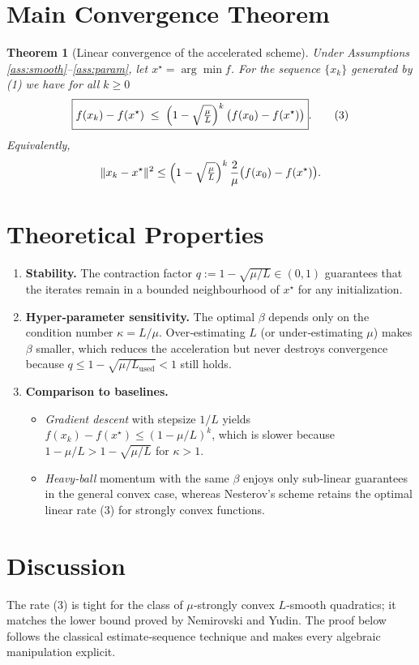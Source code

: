 \documentclass{article}
\newtheorem{theorem}{Theorem}
\begin{document}
\section*{Main Convergence Theorem}
\begin{theorem}[Linear convergence of the accelerated scheme]\label{thm:linear}
Under Assumptions \ref{ass:smooth}–\ref{ass:param}, let $x^{\star}=\arg\min f$.  
For the sequence $\{x_k\}$ generated by (1) we have for all $k\ge 0$
\[
\boxed{
f(x_k)-f(x^{\star})\;\le\;\Bigl(1-\sqrt{\tfrac{\mu}{L}}\Bigr)^{k}\,
\bigl(f(x_0)-f(x^{\star})\bigr)}.
\tag{3}
\]
Equivalently,
\[
\|x_k-x^{\star}\|^{2}\le
\Bigl(1-\sqrt{\tfrac{\mu}{L}}\Bigr)^{k}\,
\frac{2}{\mu}\bigl(f(x_0)-f(x^{\star})\bigr).
\]
\end{theorem}

\section*{Theoretical Properties}
\begin{enumerate}[label=\arabic*.]
\item \textbf{Stability.} The contraction factor $q:=1-\sqrt{\mu/L}\in(0,1)$ guarantees that the iterates remain in a bounded neighbourhood of $x^{\star}$ for any initialization.
\item \textbf{Hyper‑parameter sensitivity.} The optimal $\beta$ depends only on the condition number $\kappa=L/\mu$. Over‑estimating $L$ (or under‑estimating $\mu$) makes $\beta$ smaller, which reduces the acceleration but never destroys convergence because $q\le 1-\sqrt{\mu/L_{\text{used}}}<1$ still holds.
\item \textbf{Comparison to baselines.}
    \begin{itemize}
        \item \emph{Gradient descent} with stepsize $1/L$ yields $f(x_k)-f(x^{\star})\le (1-\mu/L)^{k}$, which is slower because $1-\mu/L > 1-\sqrt{\mu/L}$ for $\kappa>1$.
        \item \emph{Heavy‑ball} momentum with the same $\beta$ enjoys only sub‑linear guarantees in the general convex case, whereas Nesterov’s scheme retains the optimal linear rate (3) for strongly convex functions.
    \end{itemize}
\end{enumerate}

\section*{Discussion}
The rate (3) is tight for the class of $\mu$‑strongly convex $L$‑smooth quadratics; it matches the lower bound proved by Nemirovski and Yudin. The proof below follows the classical estimate‑sequence technique and makes every algebraic manipulation explicit.
\end{document}
